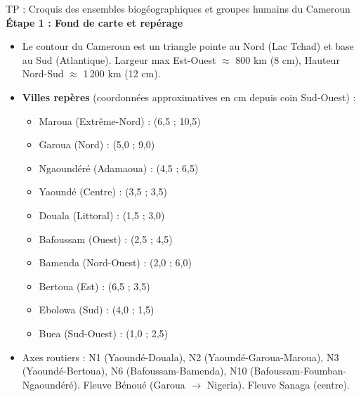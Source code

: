 \documentclass[11pt]{article}
\begin{document}
\begin{exoresolu}{TP : Croquis des ensembles biogéographiques et groupes humains du Cameroun}
\textbf{Étape 1 : Fond de carte et repérage}
\begin{itemize}
    \item Le contour du Cameroun est un triangle pointe au Nord (Lac Tchad) et base au Sud (Atlantique). Largeur max Est-Ouest $\approx$ 800 km (8 cm), Hauteur Nord-Sud $\approx$ 1\,200 km (12 cm).
    \item \textbf{Villes repères} (coordonnées approximatives en cm depuis coin Sud-Ouest) :
    \begin{itemize}
        \item Maroua (Extrême-Nord) : (6,5 ; 10,5)
        \item Garoua (Nord) : (5,0 ; 9,0)
        \item Ngaoundéré (Adamaoua) : (4,5 ; 6,5)
        \item Yaoundé (Centre) : (3,5 ; 3,5)
        \item Douala (Littoral) : (1,5 ; 3,0)
        \item Bafoussam (Ouest) : (2,5 ; 4,5)
        \item Bamenda (Nord-Ouest) : (2,0 ; 6,0)
        \item Bertoua (Est) : (6,5 ; 3,5)
        \item Ebolowa (Sud) : (4,0 ; 1,5)
        \item Buea (Sud-Ouest) : (1,0 ; 2,5)
    \end{itemize}
    \item Axes routiers : N1 (Yaoundé-Douala), N2 (Yaoundé-Garoua-Maroua), N3 (Yaoundé-Bertoua), N6 (Bafoussam-Bamenda), N10 (Bafoussam-Foumban-Ngaoundéré). Fleuve Bénoué (Garoua $\rightarrow$ Nigeria). Fleuve Sanaga (centre).
\end{itemize}


\end{exoresolu}
\end{document}
